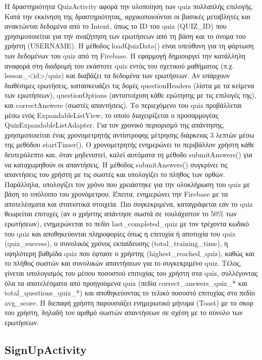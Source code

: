 \documentclass[11pt]{report}
\begin{document}
Η δραστηριότητα QuizActivity αφορά την υλοποίηση των quiz πολλαπλής επιλογής. Κατά την εκκίνηση της δραστηριότητας, αρχικοποιούνται οι βασικές μεταβλητές και ανακτώνται δεδομένα από το Intent, όπως το ID του quiz (QUIZ\_ID) που χρησιμοποιείται για την αναζήτηση των ερωτήσεων από τη βάση και το όνομα του χρήστη (USERNAME). Η μέθοδος loadQuizData() είναι υπεύθυνη για τη φόρτωση των δεδομένων του quiz από τη Firebase. Η εφαρμογή δημιουργεί την κατάλληλη αναφορά στη διαδρομή του εκάστοτε quiz εντός του σχετικού μαθήματος (π.χ. lesson\_<id>/quiz) και διαβάζει τα δεδομένα των ερωτήσεων. Αν υπάρχουν διαθέσιμες ερωτήσεις, κατασκευάζει τις δομές questionHeaders (λίστα με τα κείμενα των ερωτήσεων), questionOptions (αντιστοίχιση κάθε ερώτησης με τις επιλογές της), και correctAnswers (σωστές απαντήσεις). Το περιεχόμενο του quiz προβάλλεται μέσω ενός ExpandableListView, το οποίο διαχειρίζεται ο προσαρμογέας QuizExpandableListAdapter.
Για τον χρονικό περιορισμό της απάντησης, χρησιμοποιείται ένας χρονομετρητής αντίστροφης μέτρησης διάρκειας 3 λεπτών μέσω της μεθόδου startTimer(). Ο χρονομετρητής ενημερώνει το περιβάλλον χρήστη κάθε δευτερόλεπτο και, όταν μηδενιστεί, καλεί αυτόματα τη μέθοδο submitAnswers() για να καταχωρηθούν οι απαντήσεις. Η μέθοδος submitAnswers() συγκρίνει τις απαντήσεις του χρήστη με τις σωστές και υπολογίζει το πλήθος των ορθών. Παράλληλα, υπολογίζει τον χρόνο που χρειάστηκε για την ολοκλήρωση του quiz με βάση το υπόλοιπο του χρονόμετρου. Έπειτα, ενημερώνει την Firebase με τα αποτελέσματα και στατιστικά στοιχεία. Πιο συγκεκριμένα, καταγράφεται εάν το quiz θεωρείται επιτυχές (αν ο χρήστης απάντησε σωστά σε τουλάχιστον το 50\% των ερωτήσεων), ενημερώνεται το πεδίο last\_completed\_quiz με τον τρέχοντα κωδικό του quiz και αποθηκεύονται πληροφορίες όπως η επιτυχία ή αποτυχία του quiz (quiz\_success), ο συνολικός χρόνος εκπαίδευσης (total\_training\_time), η υψηλότερη βαθμίδα quiz που έφτασε ο χρήστης (highest\_reached\_quiz), καθώς και το πλήθος σωστών και συνολικών απαντήσεων για το συγκεκριμένο quiz.
Τέλος, γίνεται υπολογισμός του μέσου ποσοστού επιτυχίας του χρήστη στα quiz, συλλέγοντας όλα τα αποτελέσματα από προηγούμενα quiz (πεδία correct\_answers\_quiz\_* και total\_questions\_quiz\_*) και αποθηκεύοντας το τελικό ποσοστό επιτυχίας στο πεδίο avg\_score. Η διεπαφή χρήστη παρουσιάζει ενημερωτικό μήνυμα (Toast) με το σκορ του χρήστη, δηλαδή τον αριθμό σωστών απαντήσεων σε σχέση με το σύνολο των ερωτήσεων. 

\subsection{SignUpActivity}
\end{document}
